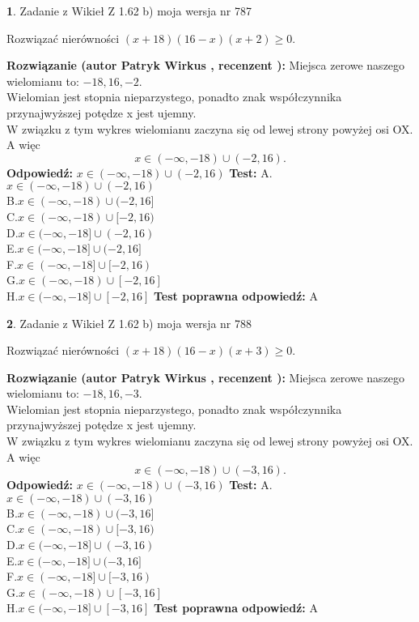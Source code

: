 \documentclass[12pt, a4paper]{article}
\theoremstyle{definition} %
\newtheorem{zad}{}
\newcommand{\zadStart}[1]{\begin{zad}#1\newline}
\newcommand{\zadStop}{\end{zad}}
\newcommand{\rozwStart}[2]{\noindent \textbf{Rozwiązanie (autor #1 , recenzent #2): }\newline}
\newcommand{\rozwStop}{\newline}
\newcommand{\odpStart}{\noindent \textbf{Odpowiedź:}\newline}
\newcommand{\odpStop}{\newline}
\newcommand{\testStart}{\noindent \textbf{Test:}\newline}
\newcommand{\testStop}{\newline}
\newcommand{\kluczStart}{\noindent \textbf{Test poprawna odpowiedź:}\newline}
\newcommand{\kluczStop}{\newline}
\begin{document}
\zadStart{Zadanie z Wikieł Z 1.62 b) moja wersja nr 787}

Rozwiązać nierówności $(x+18)(16-x)(x+2)\ge0$.
\zadStop
\rozwStart{Patryk Wirkus}{}
Miejsca zerowe naszego wielomianu to: $-18, 16, -2$.\\
Wielomian jest stopnia nieparzystego, ponadto znak współczynnika przy\linebreak najwyższej potędze x jest ujemny.\\ W związku z tym wykres wielomianu zaczyna się od lewej strony powyżej osi OX. A więc $$x \in (-\infty,-18) \cup (-2,16).$$
\rozwStop
\odpStart
$x \in (-\infty,-18) \cup (-2,16)$
\odpStop
\testStart
A.$x \in (-\infty,-18) \cup (-2,16)$\\
B.$x \in (-\infty,-18) \cup (-2,16]$\\
C.$x \in (-\infty,-18) \cup [-2,16)$\\
D.$x \in (-\infty,-18] \cup (-2,16)$\\
E.$x \in (-\infty,-18] \cup (-2,16]$\\
F.$x \in (-\infty,-18] \cup [-2,16)$\\
G.$x \in (-\infty,-18) \cup [-2,16]$\\
H.$x \in (-\infty,-18] \cup [-2,16]$
\testStop
\kluczStart
A
\kluczStop



\zadStart{Zadanie z Wikieł Z 1.62 b) moja wersja nr 788}

Rozwiązać nierówności $(x+18)(16-x)(x+3)\ge0$.
\zadStop
\rozwStart{Patryk Wirkus}{}
Miejsca zerowe naszego wielomianu to: $-18, 16, -3$.\\
Wielomian jest stopnia nieparzystego, ponadto znak współczynnika przy\linebreak najwyższej potędze x jest ujemny.\\ W związku z tym wykres wielomianu zaczyna się od lewej strony powyżej osi OX. A więc $$x \in (-\infty,-18) \cup (-3,16).$$
\rozwStop
\odpStart
$x \in (-\infty,-18) \cup (-3,16)$
\odpStop
\testStart
A.$x \in (-\infty,-18) \cup (-3,16)$\\
B.$x \in (-\infty,-18) \cup (-3,16]$\\
C.$x \in (-\infty,-18) \cup [-3,16)$\\
D.$x \in (-\infty,-18] \cup (-3,16)$\\
E.$x \in (-\infty,-18] \cup (-3,16]$\\
F.$x \in (-\infty,-18] \cup [-3,16)$\\
G.$x \in (-\infty,-18) \cup [-3,16]$\\
H.$x \in (-\infty,-18] \cup [-3,16]$
\testStop
\kluczStart
A
\kluczStop
\end{document}
